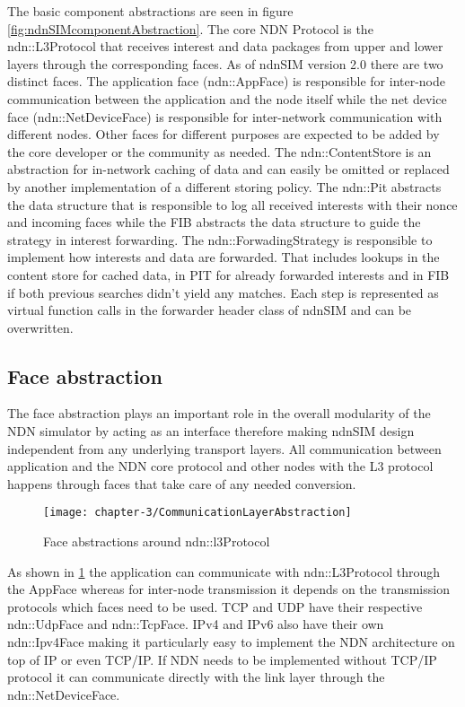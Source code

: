 The basic component abstractions are seen in figure \ref{fig:ndnSIMcomponentAbstraction}. The core NDN Protocol is the ndn::L3Protocol that receives interest and data packages from upper and lower layers through the corresponding faces. As of ndnSIM version 2.0 there are two distinct faces. The application face (ndn::AppFace) is responsible for inter-node communication between the application and the node itself while the net device face (ndn::NetDeviceFace) is responsible for inter-network communication with different nodes. Other faces for different purposes are expected to be added by the core developer or the community as needed. The ndn::ContentStore is an abstraction for in-network caching of data and can easily be omitted or replaced by another implementation of a different storing policy. The ndn::Pit abstracts the data structure that is responsible to log all received interests with their nonce and incoming faces while the FIB abstracts the data structure to guide the strategy in interest forwarding. The ndn::ForwadingStrategy is responsible to implement how interests and data are forwarded. That includes lookups in the content store for cached data, in PIT for already forwarded interests and in FIB if both previous searches didn't yield any matches. Each step is represented as virtual function calls in the forwarder header class of ndnSIM and can be overwritten.

\subsection{Face abstraction}

The face abstraction plays an important role in the overall modularity of the NDN simulator by acting as an interface therefore making ndnSIM design independent from any underlying transport layers. All communication between application and the NDN core protocol and other nodes with the L3 protocol happens through faces that take care of any needed conversion.

\begin{figure}[H]
  \centering
  \texttt{[image: chapter-3/CommunicationLayerAbstraction]}
  \caption{Face abstractions around ndn::l3Protocol}
  \label{fig:CommunicationLayerAbstraction}
\end{figure}

As shown in \ref{fig:CommunicationLayerAbstraction} the application can communicate with ndn::L3Protocol through the AppFace whereas for inter-node transmission it depends on the transmission protocols which faces need to be used. TCP and UDP have their respective ndn::UdpFace and ndn::TcpFace. IPv4 and IPv6 also have their own ndn::Ipv4Face making it particularly easy to implement the NDN architecture on top of IP or even TCP/IP. If NDN needs to be implemented without TCP/IP protocol it can communicate directly with the link layer through the ndn::NetDeviceFace.

